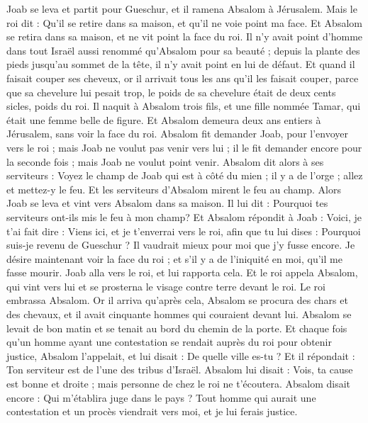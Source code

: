 \begin{multicols}{2}
Joab se leva et partit pour Gueschur, et il ramena Absalom à Jérusalem.
Mais le roi dit : Qu'il se retire dans sa maison, et qu'il ne voie point ma face. Et Absalom se retira dans sa maison, et ne vit point la face du roi.
Il n'y avait point d'homme dans tout Israël aussi renommé qu'Absalom pour sa beauté ; depuis la plante des pieds jusqu'au sommet de la tête, il n'y avait point en lui de défaut.
Et quand il faisait couper ses cheveux, or il arrivait tous les ans qu'il les faisait couper, parce que sa chevelure lui pesait trop, le poids de sa chevelure était de deux cents sicles, poids du roi.
Il naquit à Absalom trois fils, et une fille nommée Tamar, qui était une femme belle de figure.
Et Absalom demeura deux ans entiers à Jérusalem, sans voir la face du roi.
Absalom fit demander Joab, pour l'envoyer vers le roi ; mais Joab ne voulut pas venir vers lui ; il le fit demander encore pour la seconde fois ; mais Joab ne voulut point venir.
Absalom dit alors à ses serviteurs : Voyez le champ de Joab qui est à côté du mien ; il y a de l'orge ; allez et mettez-y le feu. Et les serviteurs d'Absalom mirent le feu au champ.
Alors Joab se leva et vint vers Absalom dans sa maison. Il lui dit : Pourquoi tes serviteurs ont-ils mis le feu à mon champ?
Et Absalom répondit à Joab : Voici, je t'ai fait dire : Viens ici, et je t'enverrai vers le roi, afin que tu lui dises : Pourquoi suis-je revenu de Gueschur ? Il vaudrait mieux pour moi que j'y fusse encore. Je désire maintenant voir la face du roi ; et s'il y a de l'iniquité en moi, qu'il me fasse mourir.
Joab alla vers le roi, et lui rapporta cela. Et le roi appela Absalom, qui vint vers lui et se prosterna le visage contre terre devant le roi. Le roi embrassa Absalom.
\VerseOne{}Or il arriva qu'après cela, Absalom se procura des chars et des chevaux, et il avait cinquante hommes qui couraient devant lui.
Absalom se levait de bon matin et se tenait au bord du chemin de la porte. Et chaque fois qu'un homme ayant une contestation se rendait auprès du roi pour obtenir justice, Absalom l'appelait, et lui disait : De quelle ville es-tu ? Et il répondait : Ton serviteur est de l'une des tribus d'Israël.
Absalom lui disait : Vois, ta cause est bonne et droite ; mais personne de chez le roi ne t'écoutera.
Absalom disait encore : Qui m'établira juge dans le pays ? Tout homme qui aurait une contestation et un procès viendrait vers moi, et je lui ferais justice.

\end{multicols}
